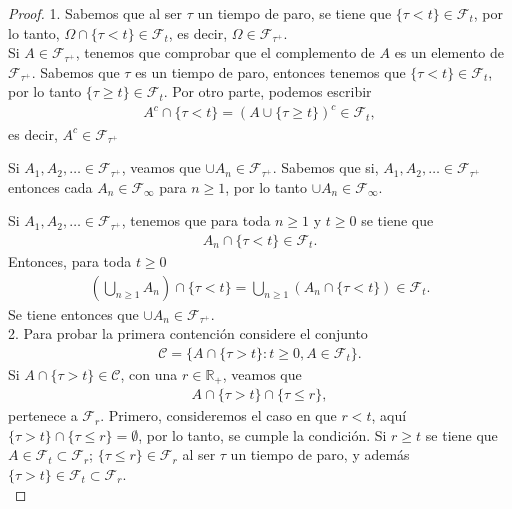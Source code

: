 \begin{proof}
1. Sabemos que al ser $\tau$ un tiempo de paro, se tiene que $\{ \tau < t \} \in \mathcal{F}_t$, por lo tanto, $\Omega \cap \{ \tau < t \} \in \mathcal{F}_t$, es decir, $\Omega \in \mathcal{F}_{\tau^{+}}$. \\

Si $A \in \mathcal{F}_{\tau^{+}}$, tenemos que comprobar que el complemento de $A$ es un elemento de $\mathcal{F}_{\tau^{+}}$. Sabemos que $\tau$ es un tiempo de paro, entonces tenemos que $\{ \tau < t\} \in \mathcal{F}_t$, por lo tanto $\{ \tau \geq t \} \in \mathcal{F}_t$. Por otro parte, podemos escribir
\begin{align*}
	A^{c} \cap \{ \tau < t \} = \left( A \cup \{ \tau \geq t \} \right)^{c} \in \mathcal{F}_t,
\end{align*}
es decir, $A^{c} \in \mathcal{F}_{\tau^{+}}$

Si $A_1, A_2, \ldots \in \mathcal{F}_{\tau^{+}}$, veamos que $\cup A_n \in \mathcal{F}_{\tau^{+}}$. Sabemos que si, $A_1, A_2, \ldots \in \mathcal{F}_{\tau^{+}}$ entonces cada $A_n \in \mathcal{F}_{\infty}$ para $n \geq 1$, por lo tanto $\cup A_n \in \mathcal{F}_{\infty}$.

Si $A_1, A_2, \ldots \in \mathcal{F}_{\tau^{+}}$, tenemos que para toda $n \geq 1$ y $t \geq 0$ se tiene que 
\begin{align*}
	A_n \cap \{\tau < t\} \in \mathcal{F}_t.
\end{align*}
Entonces, para toda $t \geq 0$
\begin{align*}
	\left( \bigcup_{n \geq 1} A_n \right) \cap \{\tau < t\} = \bigcup_{n \geq 1} \left( A_n \cap \{\tau < t\} \right) \in \mathcal{F}_t.
\end{align*}
Se tiene entonces que $\cup A_n \in \mathcal{F}_{\tau^{+}}$. \\

2. Para probar la primera contención considere el conjunto 
\begin{align*}
	\mathcal{C} = \{ A \cap \{ \tau > t \} : t \geq 0, A \in \mathcal{F}_t \}.
\end{align*}
Si $A \cap \{ \tau > t \} \in \mathcal{C}$, con una $r \in \mathbb{R}_{+}$, veamos que
\begin{align*}
	A \cap \{ \tau > t \} \cap \{ \tau \leq r \}, 
\end{align*}
pertenece a $\mathcal{F}_r$. Primero, consideremos el caso en que $r < t$, aquí $\{ \tau > t \} \cap \{ \tau \leq r \} = \emptyset$, por lo tanto, se cumple la condición. Si $r \geq t$ se tiene que $A \in \mathcal{F}_t \subset \mathcal{F}_r$; $\{ \tau \leq r \} \in \mathcal{F}_r$ al ser $\tau$ un tiempo de paro, y además $\{ \tau > t \} \in \mathcal{F}_t \subset \mathcal{F}_r$. \\


\end{proof}
